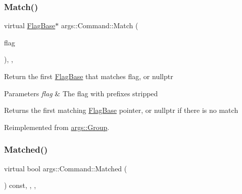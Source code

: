 \mbox{\label{classargs_1_1_command_ace018e92977b0e6ec5472cae0166523c}} 
\subsubsection{\texorpdfstring{Match()}{Match()}\hspace{0.1cm}{\footnotesize\ttfamily [2/2]}}
{\footnotesize\ttfamily virtual \hyperlink{classargs_1_1_flag_base}{Flag\+Base}$\ast$ args\+::\+Command\+::\+Match (\begin{DoxyParamCaption}\item[{const \hyperlink{structargs_1_1_either_flag}{Either\+Flag} \&}]{flag }\end{DoxyParamCaption})\hspace{0.3cm}{\ttfamily [inline]}, {\ttfamily [override]}, {\ttfamily [virtual]}}

Return the first \hyperlink{classargs_1_1_flag_base}{Flag\+Base} that matches flag, or nullptr


\begin{DoxyParams}{Parameters}
{\em flag} & The flag with prefixes stripped \\
\hline
\end{DoxyParams}
\begin{DoxyReturn}{Returns}
the first matching \hyperlink{classargs_1_1_flag_base}{Flag\+Base} pointer, or nullptr if there is no match 
\end{DoxyReturn}


Reimplemented from \hyperlink{classargs_1_1_group_a31872f412d5b32e0afaf962cd2ce5e40}{args\+::\+Group}.

\mbox{\label{classargs_1_1_command_aebb9c512301e7f0c49689ed92568ef6e}} 
\subsubsection{\texorpdfstring{Matched()}{Matched()}}
{\footnotesize\ttfamily virtual bool args\+::\+Command\+::\+Matched (\begin{DoxyParamCaption}{ }\end{DoxyParamCaption}) const\hspace{0.3cm}{\ttfamily [inline]}, {\ttfamily [override]}, {\ttfamily [virtual]}, {\ttfamily [noexcept]}}

